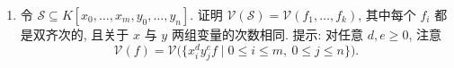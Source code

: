 \begin{BookExercises}
\begin{enumerate}
    \[
      \mathcal{V}(\mathcal{S})=\mathcal{V}(\langle\mathcal{S}\rangle)
      \subseteq\mathbb{P}^{m}\times\mathbb{P}^{n},
    \]
    并用这一点和 (a) 证明 $\mathcal{V}(\mathcal{S})=\mathcal{V}(f_{1},\ldots,f_{k})$, 其中每个 $f_{i}$ 都是双齐次的.
    \item 令 $\mathcal{S}\subseteq K[x_{0},\ldots,x_{m},y_{0},\ldots,y_{n}]$. 证明 $\mathcal{V}(\mathcal{S})=\mathcal{V}(f_{1},\ldots,f_{k})$, 其中每个 $f_{i}$ 都是双齐次的, 且关于 $x$ 与 $y$ 两组变量的次数相同. 提示: 对任意 $d,e\ge0$, 注意
    \[
      \mathcal{V}(f)=\mathcal{V}\bigl(\{x_{i}^{d}y_{j}^{e}f\mid0\le i\le m,\ 0\le j\le n\}\bigr).
    \]
  \end{enumerate}
\end{BookExercises}
